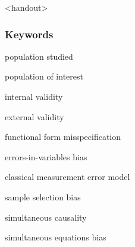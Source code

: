 

\begin{frame}<handout>
\frametitle{Keywords}
\begin{iteminline}
\item population studied
\item population of interest
\item internal validity
\item external validity
\item functional form misspecification
\item errors-in-variables bias
\item classical measurement error model
\item sample selection bias
\item simultaneous causality
\item simultaneous equations bias
\end{iteminline}
\end{frame}



